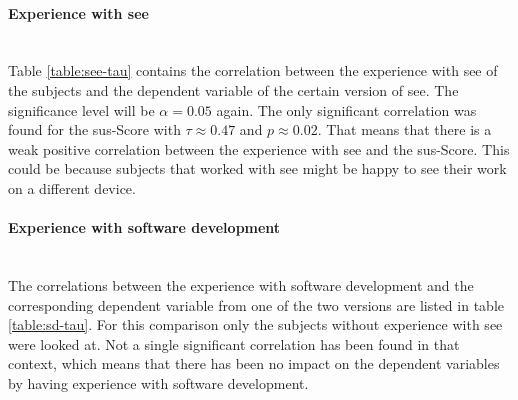 \paragraph{Experience with \gls{see}}\mbox{}\\
Table \ref{table:see-tau} contains the correlation between the experience with \gls{see} of the subjects and the dependent variable of the certain version of \gls{see}.
The significance level will be $\alpha = 0.05$ again.
The only significant correlation was found for the \gls{sus}-Score with $\tau \approx 0.47$ and $p \approx 0.02$. 
That means that there is a weak positive correlation between the experience with \gls{see} and the \gls{sus}-Score.
This could be because subjects that worked with \gls{see} might be happy to see their work on a different device.

\begin{table}[]
  \caption{Correlation between experience with \gls{see} and the dependent variables calculated with the \gls{tau}}
  \label{table:see-tau}
  \end{table}

\paragraph{Experience with software development}\mbox{}\\
The correlations between the experience with software development and the corresponding dependent variable from one of the two versions are listed in table \ref{table:sd-tau}.
For this comparison only the subjects without experience with \gls{see} were looked at.
Not a single significant correlation has been found in that context, which means that there has been no impact on the dependent variables by having experience with software development.

